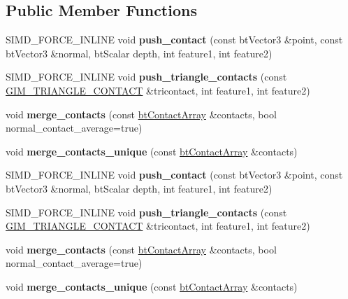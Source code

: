\subsection*{Public Member Functions}
\begin{DoxyCompactItemize}
\item 
\mbox{\label{classbtContactArray_a5ced019981636316b93fef70db421451}} 
S\+I\+M\+D\+\_\+\+F\+O\+R\+C\+E\+\_\+\+I\+N\+L\+I\+NE void {\bfseries push\+\_\+contact} (const bt\+Vector3 \&point, const bt\+Vector3 \&normal, bt\+Scalar depth, int feature1, int feature2)
\item 
\mbox{\label{classbtContactArray_a0ea62ec8f119f5d4f53e7e948c91c08a}} 
S\+I\+M\+D\+\_\+\+F\+O\+R\+C\+E\+\_\+\+I\+N\+L\+I\+NE void {\bfseries push\+\_\+triangle\+\_\+contacts} (const \hyperlink{structGIM__TRIANGLE__CONTACT}{G\+I\+M\+\_\+\+T\+R\+I\+A\+N\+G\+L\+E\+\_\+\+C\+O\+N\+T\+A\+CT} \&tricontact, int feature1, int feature2)
\item 
\mbox{\label{classbtContactArray_aa05f154d28c59b3885445031b44b1e18}} 
void {\bfseries merge\+\_\+contacts} (const \hyperlink{classbtContactArray}{bt\+Contact\+Array} \&contacts, bool normal\+\_\+contact\+\_\+average=true)
\item 
\mbox{\label{classbtContactArray_a8eba4c3e9f8fef58c39f168635280afc}} 
void {\bfseries merge\+\_\+contacts\+\_\+unique} (const \hyperlink{classbtContactArray}{bt\+Contact\+Array} \&contacts)
\item 
\mbox{\label{classbtContactArray_a5ced019981636316b93fef70db421451}} 
S\+I\+M\+D\+\_\+\+F\+O\+R\+C\+E\+\_\+\+I\+N\+L\+I\+NE void {\bfseries push\+\_\+contact} (const bt\+Vector3 \&point, const bt\+Vector3 \&normal, bt\+Scalar depth, int feature1, int feature2)
\item 
\mbox{\label{classbtContactArray_a0ea62ec8f119f5d4f53e7e948c91c08a}} 
S\+I\+M\+D\+\_\+\+F\+O\+R\+C\+E\+\_\+\+I\+N\+L\+I\+NE void {\bfseries push\+\_\+triangle\+\_\+contacts} (const \hyperlink{structGIM__TRIANGLE__CONTACT}{G\+I\+M\+\_\+\+T\+R\+I\+A\+N\+G\+L\+E\+\_\+\+C\+O\+N\+T\+A\+CT} \&tricontact, int feature1, int feature2)
\item 
\mbox{\label{classbtContactArray_aa05f154d28c59b3885445031b44b1e18}} 
void {\bfseries merge\+\_\+contacts} (const \hyperlink{classbtContactArray}{bt\+Contact\+Array} \&contacts, bool normal\+\_\+contact\+\_\+average=true)
\item 
\mbox{\label{classbtContactArray_a8eba4c3e9f8fef58c39f168635280afc}} 
void {\bfseries merge\+\_\+contacts\+\_\+unique} (const \hyperlink{classbtContactArray}{bt\+Contact\+Array} \&contacts)
\end{DoxyCompactItemize}
